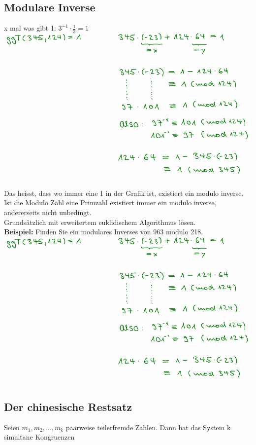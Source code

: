 \documentclass[12pt]{scrartcl}
\begin{document}
\subsection{Modulare Inverse}
x mal was gibt 1: $3^{-1} \cdot \frac{1}{3} = 1$\\

\includegraphics[width=14cm]{img/modulo inverse_beispiel.png}


Das heisst, dass wo immer eine 1 in der Grafik ist, existiert ein modulo inverse.
Ist die Modulo Zahl eine Primzahl existiert immer ein modulo inverse, andererseits nicht unbedingt.\\

Grundsätzlich mit erweitertem euklidischem Algorithmus lösen.\\

\textbf{Beispiel:}
Finden Sie ein modulares Inverses von 963 modulo 218.\\

\includegraphics[width=14cm]{img/modulo inverse_beispiel.png}


\subsection{Der chinesische Restsatz}
Seien $m_1,m_2, \dots, m_k$ paarweise teilerfremde Zahlen. Dann hat das System k simultane Kongruenzen\\
\end{document}
